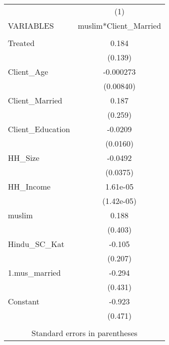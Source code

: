 \begin{tabular}{lc} \hline
 & (1) \\
VARIABLES & muslim*Client\_Married \\ \hline
 &  \\
Treated & 0.184 \\
 & (0.139) \\
Client\_Age & -0.000273 \\
 & (0.00840) \\
Client\_Married & 0.187 \\
 & (0.259) \\
Client\_Education & -0.0209 \\
 & (0.0160) \\
HH\_Size & -0.0492 \\
 & (0.0375) \\
HH\_Income & 1.61e-05 \\
 & (1.42e-05) \\
muslim & 0.188 \\
 & (0.403) \\
Hindu\_SC\_Kat & -0.105 \\
 & (0.207) \\
1.mus\_married & -0.294 \\
 & (0.431) \\
Constant & -0.923 \\
 & (0.471) \\
 &  \\ \hline
\multicolumn{2}{c}{ Standard errors in parentheses} \\
\end{tabular}
